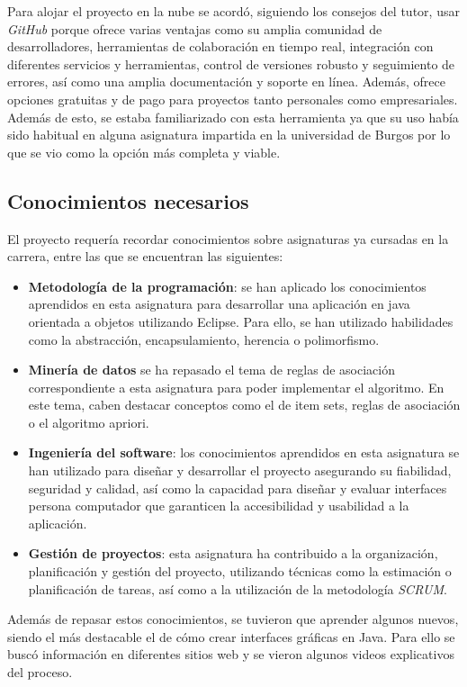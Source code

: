 Para alojar el proyecto en la nube se acordó, siguiendo los consejos del tutor, usar \textit{GitHub} porque ofrece varias ventajas como su amplia comunidad de desarrolladores, herramientas de colaboración en tiempo real, integración con diferentes servicios y herramientas, control de versiones robusto y seguimiento de errores, así como una amplia documentación y soporte en línea. Además, ofrece opciones gratuitas y de pago para proyectos tanto personales como empresariales. Además de esto, se estaba familiarizado con esta herramienta ya que su uso había sido habitual en alguna asignatura impartida en la universidad de Burgos por lo que se vio como la opción más completa y viable.

\subsection{Conocimientos necesarios}

El proyecto requería recordar conocimientos sobre asignaturas ya cursadas en la carrera, entre las que se encuentran las siguientes:

\begin{itemize}
    \item \textbf{Metodología de la programación}: se han aplicado los conocimientos aprendidos en esta asignatura para desarrollar una aplicación en java orientada a objetos utilizando Eclipse. Para ello, se han utilizado habilidades como la abstracción, encapsulamiento, herencia o polimorfismo.
    \item \textbf{Minería de datos} se ha repasado el tema de reglas de asociación correspondiente a esta asignatura para poder implementar el algoritmo. En este tema, caben destacar conceptos como el de item sets, reglas de asociación o el algoritmo apriori.
    \item \textbf{Ingeniería del software}: los conocimientos aprendidos en esta asignatura se han utilizado para diseñar y desarrollar el proyecto asegurando su fiabilidad, seguridad y calidad, así como la capacidad para diseñar y evaluar interfaces persona computador que garanticen la accesibilidad y usabilidad a la aplicación.
    \item \textbf{Gestión de proyectos}: esta asignatura ha contribuido a la organización, planificación y gestión del proyecto, utilizando técnicas como la estimación o planificación de tareas, así como a la utilización de la metodología \textit{SCRUM}.
\end{itemize}

Además de repasar estos conocimientos, se tuvieron que aprender algunos nuevos, siendo el más destacable el de cómo crear interfaces gráficas en Java. Para ello se buscó información en diferentes sitios web y se vieron algunos videos explicativos del proceso.

